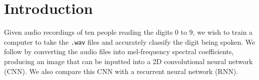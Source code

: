 \documentclass{article} %
\begin{document}
\section{Introduction}
Given audio recordings of ten people reading the digits 0 to 9, we wish to train a computer to take the \texttt{.wav} files and accurately classify the digit being spoken. We follow \cite{abdel2014convolutional} by converting the audio files into mel-frequency spectral coefficients, producing an image that can be inputted into a 2D convolutional neural network (CNN). We also compare this CNN with a recurrent neural network (RNN). 

\end{document}
